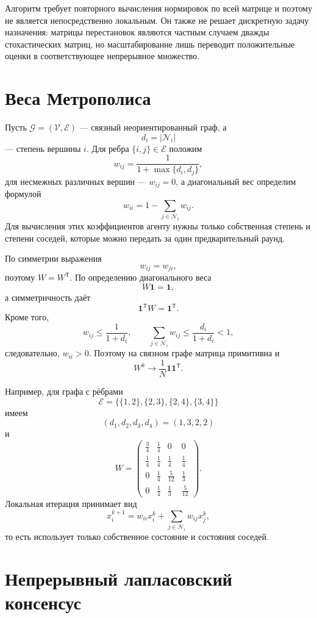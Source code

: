 Алгоритм требует повторного вычисления нормировок по всей матрице и
поэтому не является непосредственно локальным. Он также не решает
дискретную задачу назначения: матрицы перестановок являются частным
случаем дважды стохастических матриц, но масштабирование лишь переводит
положительные оценки в соответствующее непрерывное множество.

\section{Веса Метрополиса}

Пусть \(\mathcal G=(\mathcal V,\mathcal E)\) --- связный
неориентированный граф, а
\[
    d_i=|\mathcal N_i|
\]
--- степень вершины \(i\). Для ребра \(\{i,j\}\in\mathcal E\)
положим
\[
    w_{ij}
    =
    \frac1{1+\max\{d_i,d_j\}},
\]
для несмежных различных вершин --- \(w_{ij}=0\), а диагональный вес
определим формулой
\[
    w_{ii}
    =
    1-\sum_{j\in\mathcal N_i}w_{ij}.
\]
Для вычисления этих коэффициентов агенту нужны только собственная
степень и степени соседей, которые можно передать за один
предварительный раунд.

По симметрии выражения
\[
    w_{ij}=w_{ji},
\]
поэтому \(W=W^{\mathsf T}\). По определению диагонального веса
\[
    W\mathbf1=\mathbf1,
\]
а симметричность даёт
\[
    \mathbf1^{\mathsf T}W=\mathbf1^{\mathsf T}.
\]
Кроме того,
\[
    w_{ij}
    \le
    \frac1{1+d_i},
    \qquad
    \sum_{j\in\mathcal N_i}w_{ij}
    \le
    \frac{d_i}{1+d_i}<1,
\]
следовательно, \(w_{ii}>0\). Поэтому на связном графе матрица
примитивна и
\[
    W^k
    \longrightarrow
    \frac1N\mathbf1\mathbf1^{\mathsf T}.
\]

Например, для графа с рёбрами
\[
    \mathcal E
    =
    \{\{1,2\},\{2,3\},\{2,4\},\{3,4\}\}
\]
имеем
\[
    (d_1,d_2,d_3,d_4)=(1,3,2,2)
\]
и
\[
    W=
    \begin{pmatrix}
        \frac34&\frac14&0&0\\[1mm]
        \frac14&\frac14&\frac14&\frac14\\[1mm]
        0&\frac14&\frac5{12}&\frac13\\[1mm]
        0&\frac14&\frac13&\frac5{12}
    \end{pmatrix}.
\]
Локальная итерация принимает вид
\[
    x_i^{k+1}
    =
    w_{ii}x_i^k
    +
    \sum_{j\in\mathcal N_i}w_{ij}x_j^k,
\]
то есть использует только собственное состояние и состояния соседей.

\section{Непрерывный лапласовский консенсус}


